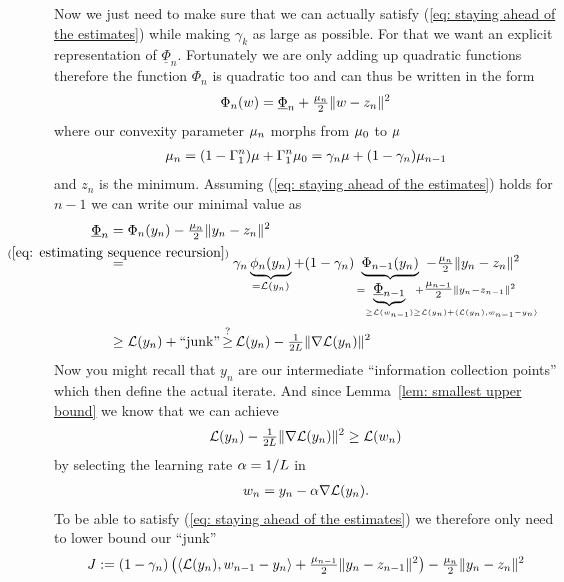 Now we just need to make sure that we can actually satisfy (\ref{eq: staying
ahead of the estimates}) while making \(\gamma_k\) as large as possible.
For that we want an explicit representation of \(\underline{\Phi}_{n}\).
Fortunately we are only adding up quadratic functions therefore the function
\(\Phi_{n}\) is quadratic too and can thus be written in the form
\begin{align}\label{eq: centered Phi representation}
	\Phi_{n}(w) = \underline{\Phi}_{n} + \tfrac{\mu_{n}}{2}\|w - z_n\|^2
\end{align}
where our convexity parameter \(\mu_n\) morphs from \(\mu_0\) to
\(\mu\)
\begin{align}\label{eq: lbound recursion}
	\mu_n =(1-\Gamma_1^n)\mu + \Gamma_1^n \mu_0
	= \gamma_n \mu + (1-\gamma_n)\mu_{n-1}
\end{align}
and \(z_n\) is the minimum. Assuming (\ref{eq: staying ahead of the estimates})
holds for \(n-1\) we can write our minimal value as
\begin{align*}
	\underline{\Phi}_n
	&= \Phi_n(y_n) - \tfrac{\lbound_n}{2}\|y_n - z_n\|^2 \\
	&\lxeq{(\ref{eq: estimating sequence recursion})}
	\gamma_n \underbrace{\phi_n(y_n)}_{
		=\Loss(y_n)
	}
	+ (1-\gamma_n)\underbrace{\Phi_{n-1}(y_n)}_{
		= \underbrace{\underline{\Phi}_{n-1}}_{
			\ge \Loss(\weights_{n-1})
			\mathrlap{\ge \Loss(y_n) + \langle \Loss(y_n), \weights_{n-1} - y_n\rangle}
		} +\mathrlap{\tfrac{\lbound_{n-1}}{2}\|y_n - z_{n-1}\|^2}
	} - \tfrac{\lbound_n}{2}\|y_n - z_n\|^2 \\
	&\ge \Loss(y_n) + \text{``junk''}
	\xge{?} \Loss(y_n) - \tfrac{1}{2\ubound}\|\nabla\Loss(y_n)\|^2
\end{align*}
Now you might recall that \(y_n\) are our intermediate ``information
collection points'' which then define the actual iterate. And
since Lemma~\ref{lem: smallest upper bound} we know that we can achieve
\begin{align*}
	\mathcal{L}(y_n) - \tfrac{1}{2L}\|\nabla\mathcal{L}(y_n)\|^2
	\ge \mathcal{L}(w_n)
\end{align*}
by selecting the learning rate \(\alpha=1/L\) in
\begin{align*}
	w_n = y_n - \alpha \nabla\mathcal{L}(y_n).
\end{align*}
To be able to satisfy (\ref{eq: staying ahead of the estimates}) we therefore
only need to lower bound our ``junk''
\begin{align*}
	J := (1-\gamma_n)\left(
		\langle \mathcal{L}(y_n), w_{n-1} - y_n\rangle
		+ \tfrac{\mu_{n-1}}{2}\|y_n - z_{n-1}\|^2
	\right)
	- \tfrac{\mu_n}{2}\|y_n - z_n\|^2
\end{align*}

